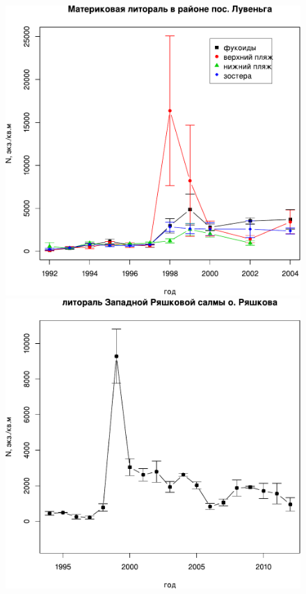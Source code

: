 \begin{figure}[p]
	\begin{minipage}[b]{.49\linewidth}
	\begin{center}
		\includegraphics[width=\linewidth]{../White_Sea//Luvenga_II_razrez/N_dynamic1.pdf}
	\end{center}
	\end{minipage}
%
	\hfil %
%
	\begin{minipage}[b]{.49\linewidth}
	\begin{center}
		\includegraphics[width=\linewidth]{../White_Sea/Ryashkov_ZRS/N_dynamic1.pdf}

\end{center}
\end{minipage}
\end{figure}
